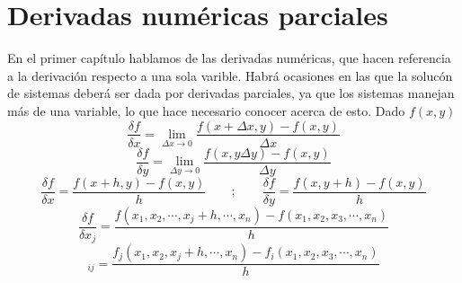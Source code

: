 
\chapter{Derivadas num\'ericas parciales}
En el primer cap\'itulo hablamos de las derivadas num\'ericas, que hacen referencia a la derivaci\'on respecto a una sola varible. Habr\'a ocasiones en las que la soluc\'on de sistemas deber\'a ser dada por derivadas parciales, ya que los sistemas manejan m\'as de una variable, lo que hace necesario conocer acerca de esto.
Dado $f(x,y)$
\begin{displaymath}
\frac{\delta f}{\delta x}=\lim_{\Delta x \to 0} \frac{f(x+\Delta x, y)-f(x,y)}{\Delta x}
\end{displaymath}
\begin{displaymath}
\frac{\delta f}{\delta y}=\lim_{\Delta y \to 0} \frac{f(x, y\Delta y)-f(x,y)}{\Delta y}
\end{displaymath}
\begin{displaymath}
\frac{\delta f}{\delta x}=\frac{f(x+h, y)-f(x,y)}{h} \qquad ; \qquad \frac{\delta f}{\delta y}=\frac{f(x, y+h)-f(x,y)}{h}
\end{displaymath}
\begin{displaymath}
\frac{\delta f}{\delta x_j}=\frac{f(x_1, x_2, \cdots , x_j+h, \cdots , x_n)-f(x_1,x_2,x_3, \cdots ,x_n)}{h}
\end{displaymath}
\begin{displaymath}
[F'(x)]_{ij}=\frac{f_j(x_1,x_2,x_j+h,\cdots ,x_n)-f_i(x_1, x_2, x_3,\cdots ,x_n)}{h}
\end{displaymath}
